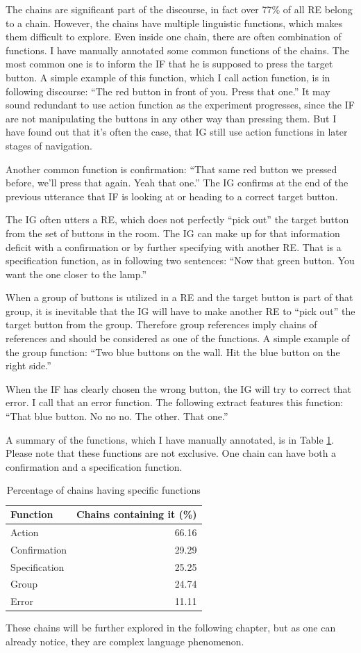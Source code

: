 The chains are significant part of the discourse, in fact over 77\% of all RE belong to a chain. However, the chains have multiple linguistic functions, which makes them difficult to explore. Even inside one chain, there are often combination of functions. I have manually annotated some common functions of the chains. The most common one is to inform the IF that he is supposed to press the target button. A simple example of this function, which I call action function, is in following discourse: ``The red button in front of you. Press that one.'' It may sound redundant to use action function as the experiment progresses, since the IF are not manipulating the buttons in any other way than pressing them. But I have found out that it's often the case, that IG still use action functions in later stages of navigation.

Another common function is confirmation: ``That same red button we pressed before, we'll press that again. Yeah that one.'' The IG confirms at the end of the previous utterance that IF is looking at or heading to a correct target button.

The IG often utters a RE, which does not perfectly ``pick out'' the target button from the set of buttons in the room. The IG can make up for that information deficit with a confirmation or by further specifying with another RE. That is a specification function, as in following two sentences: ``Now that green button. You want the one closer to the lamp.''

When a group of buttons is utilized in a RE and the target button is part of that group, it is inevitable that the IG will have to make another RE to ``pick out'' the target button from the group. Therefore group references imply chains of references and should be considered as one of the functions. A simple example of the group function: ``Two blue buttons on the wall. Hit the blue button on the right side.''

When the IF has clearly chosen the wrong button, the IG will try to correct that error. I call that an error function. The following extract features this function: ``That blue button. No no no. The other. That one.''

A summary of the functions, which I have manually annotated, is in Table \ref{tab:chains-functions}. Please note that these functions are not exclusive. One chain can have both a confirmation and a specification function.

\begin{table}[!htbp]
 \centering
\begin{tabular}{lr}
\toprule
Function   & Chains containing it (\%)  \\
\midrule
Action    		& 66.16\\
Confirmation	 	& 29.29\\
Specification 	& 25.25\\
Group 	  		& 24.74\\
Error 			& 11.11\\
\bottomrule
\end{tabular}
\caption{Percentage of chains having specific functions}
\label{tab:chains-functions}
\end{table}

These chains will be further explored in the following chapter, but as one can already notice, they are complex language phenomenon.



